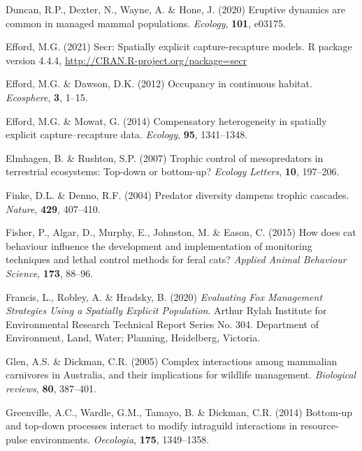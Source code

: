 \documentclass[]{elsarticle} %
\begin{document}
\leavevmode\hypertarget{ref-duncan2020eruptive}{}%
Duncan, R.P., Dexter, N., Wayne, A. \& Hone, J. (2020) Eruptive dynamics are common in managed mammal populations. \emph{Ecology}, \textbf{101}, e03175.

\leavevmode\hypertarget{ref-efford2021secr}{}%
Efford, M.G. (2021) Secr: Spatially explicit capture-recapture models. R package version 4.4.4, \url{http://CRAN.R-project.org/package=secr}

\leavevmode\hypertarget{ref-efford2012occupancy}{}%
Efford, M.G. \& Dawson, D.K. (2012) Occupancy in continuous habitat. \emph{Ecosphere}, \textbf{3}, 1--15.

\leavevmode\hypertarget{ref-efford2014compensatory}{}%
Efford, M.G. \& Mowat, G. (2014) Compensatory heterogeneity in spatially explicit capture--recapture data. \emph{Ecology}, \textbf{95}, 1341--1348.

\leavevmode\hypertarget{ref-elmhagen2007trophic}{}%
Elmhagen, B. \& Rushton, S.P. (2007) Trophic control of mesopredators in terrestrial ecosystems: Top-down or bottom-up? \emph{Ecology Letters}, \textbf{10}, 197--206.

\leavevmode\hypertarget{ref-finke2004predator}{}%
Finke, D.L. \& Denno, R.F. (2004) Predator diversity dampens trophic cascades. \emph{Nature}, \textbf{429}, 407--410.

\leavevmode\hypertarget{ref-fisher2015cat}{}%
Fisher, P., Algar, D., Murphy, E., Johnston, M. \& Eason, C. (2015) How does cat behaviour influence the development and implementation of monitoring techniques and lethal control methods for feral cats? \emph{Applied Animal Behaviour Science}, \textbf{173}, 88--96.

\leavevmode\hypertarget{ref-francis2020evaluating}{}%
Francis, L., Robley, A. \& Hradsky, B. (2020) \emph{Evaluating Fox Management Strategies Using a Spatially Explicit Population}. Arthur Rylah Institute for Environmental Research Technical Report Series No. 304. Department of Environment, Land, Water; Planning, Heidelberg, Victoria.

\leavevmode\hypertarget{ref-glen2005complex}{}%
Glen, A.S. \& Dickman, C.R. (2005) Complex interactions among mammalian carnivores in Australia, and their implications for wildlife management. \emph{Biological reviews}, \textbf{80}, 387--401.

\leavevmode\hypertarget{ref-greenville2014bottom}{}%
Greenville, A.C., Wardle, G.M., Tamayo, B. \& Dickman, C.R. (2014) Bottom-up and top-down processes interact to modify intraguild interactions in resource-pulse environments. \emph{Oecologia}, \textbf{175}, 1349--1358.
\end{document}
